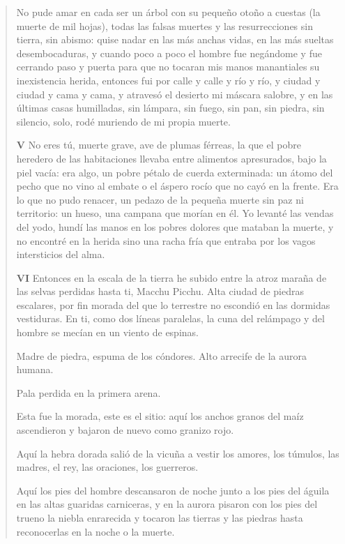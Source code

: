 \documentclass[12pt]{article}
\begin{document}
\begin{verse}
No pude amar en cada ser un árbol  
con su pequeño otoño a cuestas (la muerte de mil hojas),  
todas las falsas muertes y las resurrecciones  
sin tierra, sin abismo:  
quise nadar en las más anchas vidas,  
en las más sueltas desembocaduras,  
y cuando poco a poco el hombre fue negándome  
y fue cerrando paso y puerta para que no tocaran  
mis manos manantiales su inexistencia herida,  
entonces fui por calle y calle y río y río,  
y ciudad y ciudad y cama y cama,  
y atravesó el desierto mi máscara salobre,  
y en las últimas casas humilladas, sin lámpara, sin fuego,  
sin pan, sin piedra, sin silencio, solo,  
rodé muriendo de mi propia muerte.  

\vspace{\baselineskip}
{\scshape\bfseries V}
No eres tú, muerte grave, ave de plumas férreas,  
la que el pobre heredero de las habitaciones  
llevaba entre alimentos apresurados, bajo la piel vacía:  
era algo, un pobre pétalo de cuerda exterminada:  
un átomo del pecho que no vino al embate  
o el áspero rocío que no cayó en la frente.  
Era lo que no pudo renacer, un pedazo  
de la pequeña muerte sin paz ni territorio:  
un hueso, una campana que morían en él.  
Yo levanté las vendas del yodo, hundí las manos  
en los pobres dolores que mataban la muerte,  
y no encontré en la herida sino una racha fría  
que entraba por los vagos intersticios del alma.  

\vspace{\baselineskip}
{\scshape\bfseries VI}
Entonces en la escala de la tierra he subido  
entre la atroz maraña de las selvas perdidas  
hasta ti, Macchu Picchu.  
Alta ciudad de piedras escalares,  
por fin morada del que lo terrestre  
no escondió en las dormidas vestiduras.  
En ti, como dos líneas paralelas,  
la cuna del relámpago y del hombre  
se mecían en un viento de espinas.  
	
Madre de piedra, espuma de los cóndores.  
Alto arrecife de la aurora humana.  
	
Pala perdida en la primera arena.  
	
Esta fue la morada, este es el sitio:  
aquí los anchos granos del maíz ascendieron  
y bajaron de nuevo como granizo rojo.  
	
Aquí la hebra dorada salió de la vicuña  
a vestir los amores, los túmulos, las madres,  
el rey, las oraciones, los guerreros.  
	
Aquí los pies del hombre descansaron de noche  
junto a los pies del águila en las altas guaridas  
carniceras, y en la aurora  
pisaron con los pies del trueno la niebla enrarecida  
y tocaron las tierras y las piedras  
hasta reconocerlas en la noche o la muerte.  
	

\end{verse}
\end{document}
